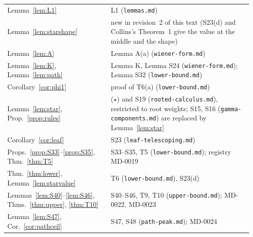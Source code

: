 \documentclass[11pt]{amsart}
\theoremstyle{definition}
\theoremstyle{remark}
\begin{document}
\smallskip
\noindent\begin{tabular}{@{}p{}p{}@{}}
Lemma~\ref{lem:L1} & L1 (\nolinkurl{lemmas.md})\\
Lemma~\ref{lem:starshape} & new in revision~2 of this text (S23(d) and Collins's Theorem~1 give the value at the middle and the shape)\\
Lemma~\ref{lem:A} & Lemma A(a) (\nolinkurl{wiener-form.md})\\
Lemma~\ref{lem:K}, Lemma~\ref{lem:path} & Lemma K, Lemma S24 (\nolinkurl{wiener-form.md}); Lemma S32 (\nolinkurl{lower-bound.md})\\
Corollary~\ref{cor:phi1} & proof of T6(a) (\nolinkurl{lower-bound.md})\\
Lemma~\ref{lem:star}, Prop.~\ref{prop:rules} & (\(\star\)) and S19 (\nolinkurl{rooted-calculus.md}), restricted to root weights; S15, S16 (\nolinkurl{gamma-components.md}) are replaced by Lemma~\ref{lem:star}\\
Corollary~\ref{cor:leaf} & S23 (\nolinkurl{leaf-telescoping.md})\\
Props.~\ref{prop:S33}--\ref{prop:S35}, Thm.~\ref{thm:T5} & S33--S35, T5 (\nolinkurl{lower-bound.md}); registry MD-0019\\
Thm.~\ref{thm:lower}, Lemma~\ref{lem:starvalue} & T6 (\nolinkurl{lower-bound.md}), S23(d)\\
Lemmas~\ref{lem:S40}--\ref{lem:S46}, Thms.~\ref{thm:upper}, \ref{thm:T10} & S40--S46, T9, T10 (\nolinkurl{upper-bound.md}); MD-0022, MD-0023\\
Lemma~\ref{lem:S47}, Cor.~\ref{cor:pathceil} & S47, S48 (\nolinkurl{path-peak.md}); MD-0024\\
\end{tabular}
\end{document}
